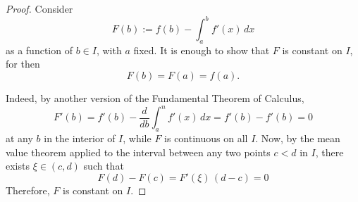 

\begin{proof}

Consider
$$
F(b) := f(b) - \int_a^b f'(x)\,dx 
$$
as a function of $b\in I$, with $a$ fixed. It is enough to 
show that $F$ is constant on $I$, for then 
$$
F(b) = F(a) = f(a).
$$

Indeed, by another version of the Fundamental Theorem of Calculus,
$$
F'(b) = f'(b) - \frac{d}{db}\int_a^n f'(x)\, dx = f'(b) - f'(b) = 0
$$
at any $b$ in the interior of $I$, while $F$ is continuous on all $I$. 
Now, by the mean value theorem applied to the interval between any 
two points $c<d$ in $I$, 
there exists $\xi\in (c,d)$ such that
$$
F(d) - F(c) = F'(\xi)\, (d-c) = 0
$$
Therefore, $F$ is constant on $I$.

\end{proof}

